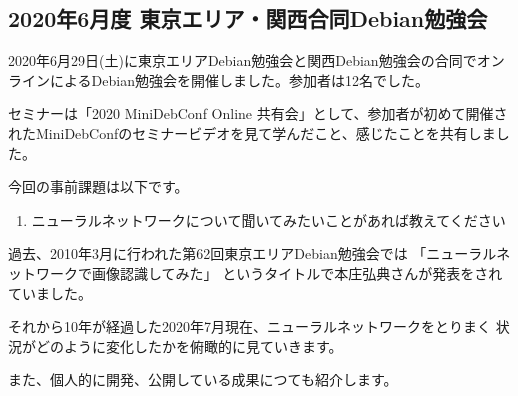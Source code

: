 \documentclass[mingoth,a4paper]{jsarticle}
\begin{document}

\subsection{2020年6月度 東京エリア・関西合同Debian勉強会}

2020年6月29日(土)に東京エリアDebian勉強会と関西Debian勉強会の合同でオンラインによるDebian勉強会を開催しました。参加者は12名でした。

セミナーは「2020 MiniDebConf Online 共有会」として、参加者が初めて開催されたMiniDebConfのセミナービデオを見て学んだこと、感じたことを共有しました。


今回の事前課題は以下です。

\begin{enumerate}
\item ニューラルネットワークについて聞いてみたいことがあれば教えてください
\end{enumerate}


\begin{multicols}{2}
{\small

}
\end{multicols}

%
%
%
%





過去、2010年3月に行われた第62回東京エリアDebian勉強会では
「ニューラルネットワークで画像認識してみた」
というタイトルで本庄弘典さんが発表をされていました。

それから10年が経過した2020年7月現在、ニューラルネットワークをとりまく
状況がどのように変化したかを俯瞰的に見ていきます。

また、個人的に開発、公開している成果につても紹介します。
\end{document}
